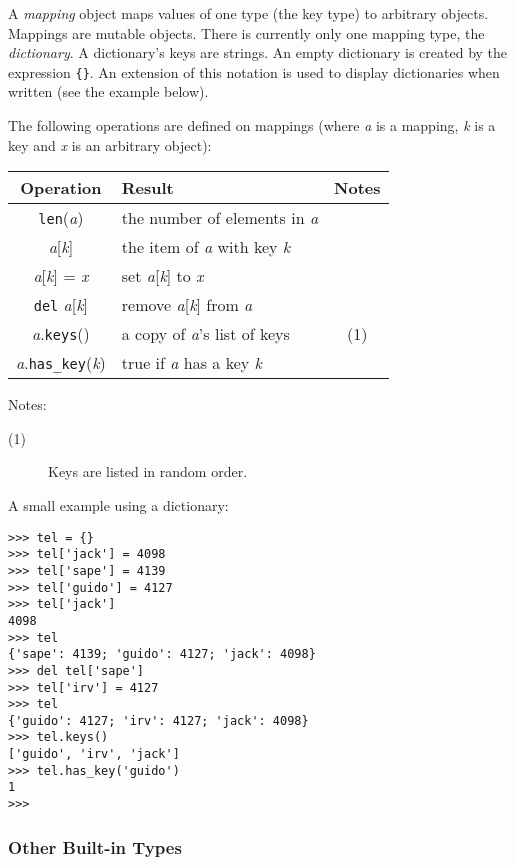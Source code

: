 A
{\em mapping}
object maps values of one type (the key type) to arbitrary objects.
Mappings are mutable objects.
There is currently only one mapping type, the
{\em dictionary}.
A dictionary's keys are strings.
An empty dictionary is created by the expression \verb"{}".
An extension of this notation is used to display dictionaries when
written (see the example below).

The following operations are defined on mappings (where {\em a} is a
mapping, {\em k} is a key and {\em x} is an arbitrary object):

\begin{center}
\begin{tabular}{|c|l|c|}
\hline
Operation & Result & Notes\\
\hline
{\tt len}({\em a}) & the number of elements in {\em a} & \\
{\em a}[{\em k}] & the item of {\em a} with key {\em k} & \\
{\em a}[{\em k}] = {\em x} & set {\em a}[{\em k}] to {\em x} & \\
{\tt del} {\em a}[{\em k}] & remove {\em a}[{\em k}] from {\em a} & \\
{\em a}.{\tt keys}() & a copy of {\em a}'s list of keys & (1) \\
{\em a}.{\tt has\_key}({\em k}) & true if {\em a} has a key {\em k} & \\
\hline
\end{tabular}
\end{center}

\noindent
Notes:
\begin{description}
\item[(1)]
Keys are listed in random order.
\end{description}

A small example using a dictionary:
\begin{code}\begin{verbatim}
>>> tel = {}
>>> tel['jack'] = 4098
>>> tel['sape'] = 4139
>>> tel['guido'] = 4127
>>> tel['jack']
4098
>>> tel
{'sape': 4139; 'guido': 4127; 'jack': 4098}
>>> del tel['sape']
>>> tel['irv'] = 4127
>>> tel
{'guido': 4127; 'irv': 4127; 'jack': 4098}
>>> tel.keys()
['guido', 'irv', 'jack']
>>> tel.has_key('guido')
1
>>> 
\end{verbatim}\end{code}
\subsubsection{Other Built-in Types}

